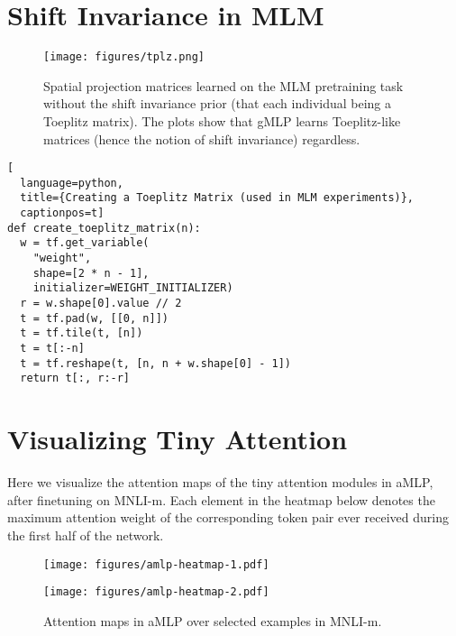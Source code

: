 \documentclass{article}
\newcommand{\gffn}{gMLP\xspace}
\begin{document}
\FloatBarrier
\section{Shift Invariance in MLM}
\label{sec:shift-invariance}

\begin{figure}[h]
    \centering
    \texttt{[image: figures/tplz.png]}
    \caption{Spatial projection matrices learned on the MLM pretraining task without the shift invariance prior (that each individual  being a Toeplitz matrix). The plots show that \gffn learns Toeplitz-like matrices (hence the notion of shift invariance) regardless.}
    \label{fig:mlm-no-tplz}
\end{figure}

\FloatBarrier

\begin{lstlisting}[
  language=python,
  title={Creating a Toeplitz Matrix (used in MLM experiments)},
  captionpos=t]
def create_toeplitz_matrix(n):
  w = tf.get_variable(
    "weight",
    shape=[2 * n - 1],
    initializer=WEIGHT_INITIALIZER)
  r = w.shape[0].value // 2
  t = tf.pad(w, [[0, n]])
  t = tf.tile(t, [n])
  t = t[:-n]
  t = tf.reshape(t, [n, n + w.shape[0] - 1])
  return t[:, r:-r]
\end{lstlisting}

\FloatBarrier
\section{Visualizing Tiny Attention}
\label{sec:visualize-tiny-attn}
Here we visualize the attention maps of the tiny attention modules in aMLP, after finetuning on MNLI-m. Each element in the heatmap below denotes the maximum attention weight of the corresponding token pair ever received during the first half of the network.

\begin{figure}[h]
    \centering
    \texttt{[image: figures/amlp-heatmap-1.pdf]}
\end{figure}

\begin{figure}[h]
    \centering
    \texttt{[image: figures/amlp-heatmap-2.pdf]}
    \caption{Attention maps in aMLP over selected examples in MNLI-m.}
\end{figure}
    
\end{document}
